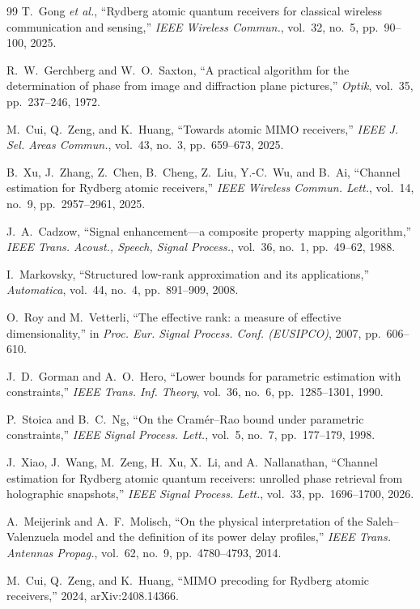 \documentclass[conference]{IEEEtran}
\begin{document}
\begin{thebibliography}{99}
 T.~Gong \emph{et al.}, ``Rydberg atomic quantum receivers
for classical wireless communication and sensing,'' \emph{IEEE Wireless
Commun.}, vol.~32, no.~5, pp.~90--100, 2025.

 R.~W.~Gerchberg and W.~O.~Saxton, ``A practical
algorithm for the determination of phase from image and diffraction plane
pictures,'' \emph{Optik}, vol.~35, pp.~237--246, 1972.

 M.~Cui, Q.~Zeng, and K.~Huang, ``Towards atomic MIMO
receivers,'' \emph{IEEE J. Sel. Areas Commun.}, vol.~43, no.~3, pp.~659--673,
2025.

 B.~Xu, J.~Zhang, Z.~Chen, B.~Cheng, Z.~Liu, Y.-C.~Wu, and
B.~Ai, ``Channel estimation for Rydberg atomic receivers,'' \emph{IEEE Wireless
Commun. Lett.}, vol.~14, no.~9, pp.~2957--2961, 2025.

 J.~A.~Cadzow, ``Signal enhancement---a composite property
mapping algorithm,'' \emph{IEEE Trans. Acoust., Speech, Signal Process.},
vol.~36, no.~1, pp.~49--62, 1988.

 I.~Markovsky, ``Structured low-rank approximation and
its applications,'' \emph{Automatica}, vol.~44, no.~4, pp.~891--909, 2008.

 O.~Roy and M.~Vetterli, ``The effective rank: a
measure of effective dimensionality,'' in \emph{Proc. Eur. Signal Process.
Conf. (EUSIPCO)}, 2007, pp.~606--610.

 J.~D.~Gorman and A.~O.~Hero, ``Lower bounds for parametric
estimation with constraints,'' \emph{IEEE Trans. Inf. Theory}, vol.~36, no.~6,
pp.~1285--1301, 1990.

 P.~Stoica and B.~C.~Ng, ``On the Cram\'er--Rao bound under
parametric constraints,'' \emph{IEEE Signal Process. Lett.}, vol.~5, no.~7,
pp.~177--179, 1998.

 J.~Xiao, J.~Wang, M.~Zeng, H.~Xu, X.~Li, and
A.~Nallanathan, ``Channel estimation for Rydberg atomic quantum receivers:
unrolled phase retrieval from holographic snapshots,'' \emph{IEEE Signal
Process. Lett.}, vol.~33, pp.~1696--1700, 2026.

 A.~Meijerink and A.~F.~Molisch, ``On the physical
interpretation of the Saleh--Valenzuela model and the definition of its power
delay profiles,'' \emph{IEEE Trans. Antennas Propag.}, vol.~62, no.~9,
pp.~4780--4793, 2014.

 M.~Cui, Q.~Zeng, and K.~Huang, ``MIMO precoding for
Rydberg atomic receivers,'' 2024, arXiv:2408.14366.
\end{thebibliography}
\end{document}
